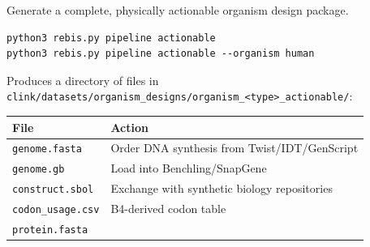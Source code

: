 Generate a complete, physically actionable organism design package.

\begin{verbatim}
python3 rebis.py pipeline actionable
python3 rebis.py pipeline actionable --organism human
\end{verbatim}

Produces a directory of files in
\texttt{clink/datasets/organism\_designs/organism\_\textless{}type\textgreater{}\_actionable/}:

\begin{longtable}[]{@{}ll@{}}
\toprule
\begin{minipage}[b]{0.40\columnwidth}\raggedright
File\strut
\end{minipage} & \begin{minipage}[b]{0.54\columnwidth}\raggedright
Action\strut
\end{minipage}\tabularnewline
\midrule
\endhead
\begin{minipage}[t]{0.40\columnwidth}\raggedright
\texttt{genome.fasta}\strut
\end{minipage} & \begin{minipage}[t]{0.54\columnwidth}\raggedright
Order DNA synthesis from Twist/IDT/GenScript\strut
\end{minipage}\tabularnewline
\begin{minipage}[t]{0.40\columnwidth}\raggedright
\texttt{genome.gb}\strut
\end{minipage} & \begin{minipage}[t]{0.54\columnwidth}\raggedright
Load into Benchling/SnapGene\strut
\end{minipage}\tabularnewline
\begin{minipage}[t]{0.40\columnwidth}\raggedright
\texttt{construct.sbol}\strut
\end{minipage} & \begin{minipage}[t]{0.54\columnwidth}\raggedright
Exchange with synthetic biology repositories\strut
\end{minipage}\tabularnewline
\begin{minipage}[t]{0.40\columnwidth}\raggedright
\texttt{codon\_usage.csv}\strut
\end{minipage} & \begin{minipage}[t]{0.54\columnwidth}\raggedright
B4-derived codon table\strut
\end{minipage}\tabularnewline
\begin{minipage}[t]{0.40\columnwidth}\raggedright
\texttt{protein.fasta}\strut
\end{minipage} & \begin{minipage}[t]{0.54\columnwidth}\raggedright

\end{minipage}
\end{longtable}

